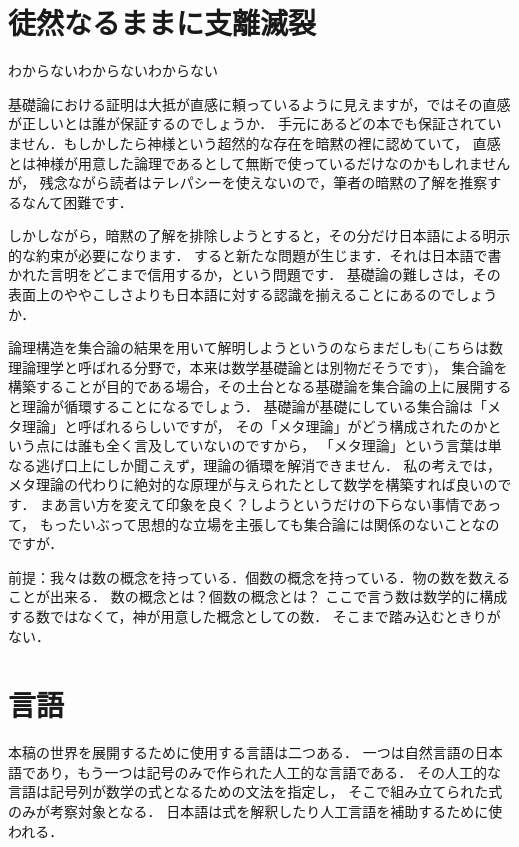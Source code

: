 \documentclass[a4j,10.5pt,oneside,openany]{jsbook}
\theoremstyle{mystyle}
\begin{document}

\section{徒然なるままに支離滅裂}
わからないわからないわからない

基礎論における証明は大抵が直感に頼っているように見えますが，ではその直感が正しいとは誰が保証するのでしょうか．
手元にあるどの本でも保証されていません．もしかしたら神様という超然的な存在を暗黙の裡に認めていて，
直感とは神様が用意した論理であるとして無断で使っているだけなのかもしれませんが，
残念ながら読者はテレパシーを使えないので，筆者の暗黙の了解を推察するなんて困難です．

しかしながら，暗黙の了解を排除しようとすると，その分だけ日本語による明示的な約束が必要になります．
すると新たな問題が生じます．それは日本語で書かれた言明をどこまで信用するか，という問題です．
基礎論の難しさは，その表面上のややこしさよりも日本語に対する認識を揃えることにあるのでしょうか．

論理構造を集合論の結果を用いて解明しようというのならまだしも(こちらは数理論理学と呼ばれる分野で，本来は数学基礎論とは別物だそうです)，
集合論を構築することが目的である場合，その土台となる基礎論を集合論の上に展開すると理論が循環することになるでしょう．
基礎論が基礎にしている集合論は「メタ理論」と呼ばれるらしいですが，
その「メタ理論」がどう構成されたのかという点には誰も全く言及していないのですから，
「メタ理論」という言葉は単なる逃げ口上にしか聞こえず，理論の循環を解消できません．
私の考えでは，メタ理論の代わりに絶対的な原理が与えられたとして数学を構築すれば良いのです．
まあ言い方を変えて印象を良く？しようというだけの下らない事情であって，
もったいぶって思想的な立場を主張しても集合論には関係のないことなのですが．

前提：我々は数の概念を持っている．個数の概念を持っている．物の数を数えることが出来る．
数の概念とは？個数の概念とは？
ここで言う数は数学的に構成する数ではなくて，神が用意した概念としての数．
そこまで踏み込むときりがない．

\section{言語}
	本稿の世界を展開するために使用する言語は二つある．
	一つは自然言語の日本語であり，もう一つは記号のみで作られた人工的な言語である．
	その人工的な言語は記号列が数学の式となるための文法を指定し，
	そこで組み立てられた式のみが考察対象となる．
	日本語は式を解釈したり人工言語を補助するために使われる．
	
\end{document}
